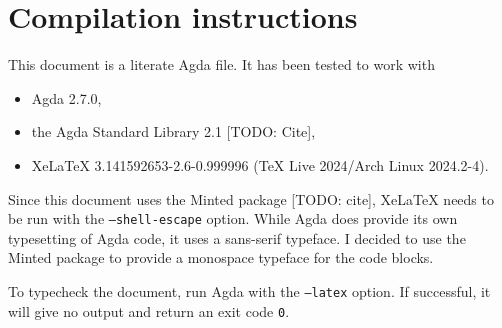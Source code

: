 \documentclass[logo,bsc,singlespacing,parskip,online]{infthesis}
\begin{document}
\chapter{Compilation instructions}
\label{appendix:compilation_instructions}

This document is a literate Agda file. It has been tested to work with
\begin{itemize}
  \item Agda 2.7.0,
  \item the Agda Standard Library 2.1 [TODO: Cite],
  \item XeLaTeX 3.141592653-2.6-0.999996 (TeX Live 2024/Arch Linux 2024.2-4).
\end{itemize}

Since this document uses the Minted package [TODO: cite], XeLaTeX needs to be run with the
\texttt{--shell-escape} option. While Agda does provide its own typesetting of Agda code, it uses a
sans-serif typeface. I decided to use the Minted package to provide a monospace typeface for the
code blocks.

To typecheck the document, run Agda with the \texttt{--latex} option. If successful, it will give no
output and return an exit code \texttt{0}.
\end{document}
